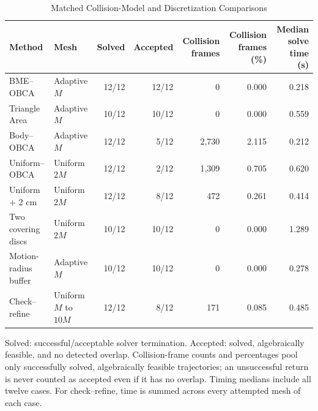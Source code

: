 \begin{table}[t]
\caption{Matched Collision-Model and Discretization Comparisons}\label{tab:comparison}
\centering\footnotesize
\begin{tabular}{@{}llrrrrr@{}}\toprule
Method&Mesh&Solved&Accepted&Collision frames&Collision frames (\%)&Median solve time (s)\\\midrule
BME--OBCA&Adaptive $M$&12/12&12/12&0&0.000&0.218\\
Triangle Area&Adaptive $M$&10/12&10/12&0&0.000&0.559\\
Body--OBCA&Adaptive $M$&12/12&5/12&2,730&2.115&0.212\\
Uniform--OBCA&Uniform $2M$&12/12&2/12&1,309&0.705&0.620\\
Uniform + 2 cm&Uniform $2M$&12/12&8/12&472&0.261&0.414\\
Two covering discs&Uniform $2M$&10/12&10/12&0&0.000&1.289\\
Motion-radius buffer&Adaptive $M$&10/12&10/12&0&0.000&0.278\\
Check--refine&Uniform $M$ to $10M$&12/12&8/12&171&0.085&0.485\\
\bottomrule\end{tabular}
\par\smallskip\parbox{\textwidth}{\footnotesize Solved: successful/acceptable solver termination. Accepted: solved, algebraically feasible, and no detected overlap. Collision-frame counts and percentages pool only successfully solved, algebraically feasible trajectories; an unsuccessful return is never counted as accepted even if it has no overlap. Timing medians include all twelve cases. For check--refine, time is summed across every attempted mesh of each case.}
\end{table}